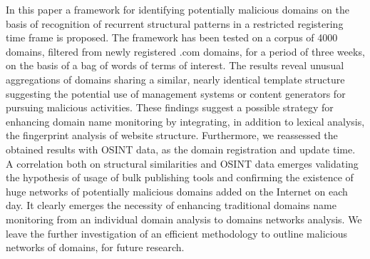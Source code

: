 \documentclass{easychair}
\begin{document}
In this paper a framework for identifying potentially malicious domains on the basis of recognition of recurrent structural patterns in a restricted registering time frame is proposed. The framework has been tested on a corpus of 4000 domains, filtered from newly registered .com domains, for a period of three weeks, on the basis of a bag of words of terms of interest.  
 The results reveal unusual aggregations of domains sharing a similar, nearly identical template structure suggesting the potential use of management systems or content generators for pursuing malicious activities. These findings suggest a possible strategy for enhancing domain name monitoring by integrating, in addition to lexical analysis, the fingerprint analysis of website structure. Furthermore, we reassessed the obtained results with OSINT data, as the domain registration and update time. A correlation both on structural similarities and OSINT data emerges validating the hypothesis of usage of bulk publishing tools and confirming the existence of huge networks of  potentially malicious domains added on the Internet on each day.
It clearly emerges the necessity of enhancing traditional domains name monitoring from an individual domain analysis to domains networks analysis. We leave the further investigation of an efficient methodology to outline malicious networks of domains, for future research.

\label{sect:bib}

%
%
%



\end{document}
